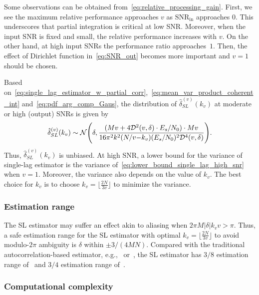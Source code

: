 Some observations can be obtained from~\eqref{eq:relative_processing_gain}.
First, we see the maximum relative performance approaches $v$ as
$\text{SNR}_{\text{in}}$ approaches 0.
This underscores that partial integration is critical at low SNR.
Moreover, when the input SNR is fixed and small, the relative performance
increases with $v$.
On the other hand, at high input SNRs the performance ratio approaches~$1$.
Then, the effect of Dirichlet function in~\eqref{eq:SNR_out}
becomes more important and
$v=1$ should be chosen.

Based on~\eqref{eq:single_lag_estimator_w_partial_corr},~\eqref{eq:mean_var_product_coherent_int}
and~\eqref{eq:pdf_arg_comp_Gaus},
the distribution of $\hat{\delta}_{SL}^{(v)}(k_v)$ at moderate or high
(output) SNRs is given by
\begin{equation}
  \label{eq:lower_bound_single_lag_high_snr}
  \hat{\delta}_{SL}^{(v)}(k_v) \sim \mathcal{N} \Bigg(\delta,\frac{(Mv+4\mathcal{D}^2(v,\delta)\cdot E_s/N_0)\cdot Mv}{16\pi^2k^2(N/v{-}k_v)(E_s/N_0)^2\mathcal{D}^4(v,\delta)}\Bigg).
\end{equation}
Thus, $\hat{\delta}_{SL}^{(v)}(k_v)$ is unbiased. 
At high SNR, a lower bound for the variance of single-lag estimator is 
the variance of~\eqref{eq:lower_bound_single_lag_high_snr} when $v=1$.
Moreover, the variance also depends on
the value of $k_v$.
The best choice for $k_v$ is to choose 
$k_v=\lfloor\frac{2N}{3v}\rfloor$ to minimize the variance.

\subsubsection{Estimation range}
The SL estimator may suffer an effect
akin to aliasing when  $2\pi M|\delta|k_vv{>}\pi$.
Thus, a safe estimation range for the SL estimator with optimal
$k_v=\lfloor\frac{2N}{3v}\rfloor$
to avoid modulo-$2\pi$ ambiguity
is $\delta$ within $\pm 3/(4MN)$. 
Compared with the traditional autocorrelation-based estimator,
e.g.,~\cite{Luise_Reggiannini_95} or~\cite{Fitz_94},
the SL estimator has 
$3/8$ estimation range of~\cite{Luise_Reggiannini_95} and $3/4$ estimation range of~\cite{Fitz_94}.

\subsubsection{Computational complexity}


